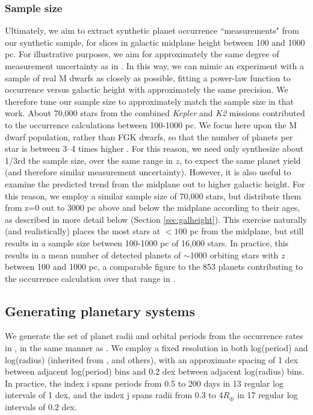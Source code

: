 \documentclass[twocolumn]{aastex631}
\begin{document}
\subsubsection{Sample size}
\label{sec:sample_size}

Ultimately, we aim to extract synthetic planet occurrence ``measurements" from our synthetic sample, for slices in galactic midplane height between 100 and 1000 pc. For illustrative purposes, we aim for approximately the same degree of measurement uncertainty as in \cite{zink_scaling_2023}. In this way, we can mimic an experiment with a sample of real M dwarfs as closely as possible, fitting a power-law function to occurrence versus galactic height with approximately the same precision. We therefore tune our sample size to approximately match the sample size in that work. About 70,000 stars from the combined \textit{Kepler} and \textit{K2} missions contributed to the \cite{zink_scaling_2023} occurrence calculations between 100-1000 pc. We focus here upon the M dwarf population, rather than FGK dwarfs, so that the number of planets per star is between 3--4 times higher \citep{Mulders15}. For this reason, we need only synthesize about 1/3rd the sample size, over the same range in $z$, to expect the same planet yield (and therefore similar measurement uncertainty). However, it is also useful to examine the predicted trend from the midplane out to higher galactic height. For this reason, we employ a similar sample size of 70,000 stars, but distribute them from z=0 out to 3000 pc above and below the midplane according to their ages, as described in more detail below (Section \ref{sec:galheight}). This exercise naturally (and realistically) places the most stars at $<100$ pc from the midplane, but still results in a sample size between 100-1000 pc of 16,000 stars. In practice, this results in a mean number of detected planets of $\sim$1000 orbiting stars with $z$ between 100 and 1000 pc, a comparable figure to the 853 planets contributing to the occurrence calculation over that range in \cite{zink_scaling_2023}. 

\subsection{Generating planetary systems}
\label{subsection:planets}

We generate the set of planet radii and orbital periods from the occurrence rates in \cite{Dressing15}, in the same manner as \cite{Sullivan15}. We employ a fixed resolution in both log(period) and log(radius) (inherited from \citealt{youdin_exoplanet_2011, Howard12, Dressing13}, and others), with an approximate spacing of 1 dex between adjacent log(period) bins and 0.2 dex between adjacent log(radius) bins.  In practice, the index i spans periods from 0.5 to 200 days in 13 regular log intervals of 1 dex, and the index j spans radii from 0.3 to 4$R_{\oplus}$ in 17 regular log intervals of 0.2 dex. 
\end{document}
